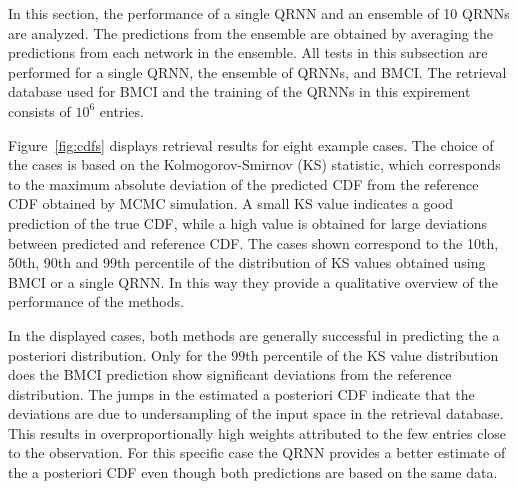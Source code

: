 \documentclass[journal abbreviation, manuscript]{copernicus}
\begin{document}
  In this section, the performance of a single QRNN and an ensemble of 10 QRNNs
  are analyzed. The predictions from the ensemble are obtained by averaging the
  predictions from each network in the ensemble. All tests in this subsection are
  performed for a single QRNN, the ensemble of QRNNs, and BMCI. The retrieval database used
  for BMCI and the training of the QRNNs in this expirement consists of $10^6$ entries.

    Figure~\ref{fig:cdfs} displays retrieval results for eight example cases. The
choice of the cases is based on the Kolmogorov-Smirnov (KS) statistic, which
corresponds to the maximum absolute deviation of the predicted CDF from the
reference CDF obtained by MCMC simulation. A small KS value indicates a good
prediction of the true CDF, while a high value is obtained for large deviations
between predicted and reference CDF. The cases shown correspond to the 10th, 50th,
 90th and 99th percentile of the distribution of KS values obtained using BMCI
or a single QRNN. In this way they provide a qualitative overview of the performance
of the methods.

In the displayed cases, both methods are generally successful in predicting the
a posteriori distribution. Only for the $99$th percentile of the KS value distribution
does the BMCI prediction show significant deviations from the reference distribution.
 The jumps in the estimated a posteriori CDF indicate that the deviations are due to
undersampling of the input space in the retrieval database. This results in
overproportionally high weights attributed to the few entries close to the
observation. For this specific case the QRNN provides a better estimate of the a
posteriori CDF even though both predictions are based on the same data.
\end{document}
